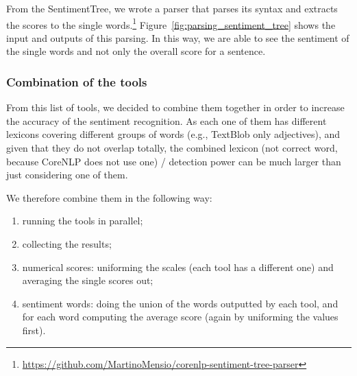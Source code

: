 From the SentimentTree, we wrote a parser that parses its syntax and extracts the scores to the single words.\footnote{\url{https://github.com/MartinoMensio/corenlp-sentiment-tree-parser}}
Figure~\ref{fig:parsing_sentiment_tree} shows the input and outputs of this parsing.
In this way, we are able to see the sentiment of the single words and not only the overall score for a sentence.

\subsubsection{\statusgreen Combination of the tools}
From this list of tools, we decided to combine them together in order to increase the accuracy of the sentiment recognition. %
As each one of them has different lexicons covering different groups of words (e.g., TextBlob only adjectives), and given that they do not overlap totally, the combined lexicon (not correct word, because CoreNLP does not use one) / detection power can be much larger than just considering one of them.

We therefore combine them in the following way:
\begin{enumerate}
    \item running the tools in parallel;
    \item collecting the results;
    \item numerical scores: uniforming the scales (each tool has a different one) and averaging the single scores out;
    \item sentiment words: doing the union of the words outputted by each tool, and for each word computing the average score (again by uniforming the values first).
\end{enumerate}

